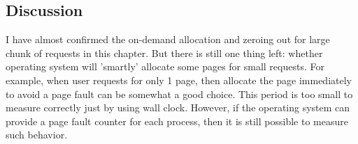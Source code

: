 \subsection{Discussion}
I have almost confirmed the on-demand allocation and zeroing out for large
chunk of requests in this chapter. But there is still one thing left: whether
operating system will 'smartly' allocate some pages for small requests. For
example, when user requests for only 1 page, then allocate the page immediately
to avoid a page fault can be somewhat a good choice. This period is too small
to measure correctly just by using wall clock. However, if the operating system
can provide a page fault counter for each process, then it is still possible to
measure such behavior.
